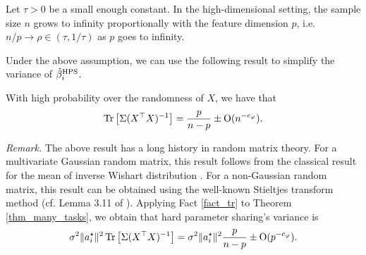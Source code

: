 \begin{assumption}\label{assume_rm}
	Let $\tau > 0$ be a small enough constant.
	In the high-dimensional setting,
  the sample size $n$ grows to infinity proportionally with the feature dimension $p$, i.e. $n / p \rightarrow \rho \in (\tau, 1/\tau)$ as $p$ goes to infinity.
\end{assumption}
Under the above assumption, we can use the following result to simplify the variance of $\hat{\beta}_i^{\textup{HPS}}$.

\begin{fact}\label{fact_tr}
	With high probability over the randomness of $X$, we have that
		\[ \operatorname{Tr}\left[\Sigma (X^{\top} X)^{-1}\right] = \frac{p}{n - p} \pm \operatorname{O}(n^{-c_{\varphi}}). \]
\end{fact}
\noindent\textit{Remark.} The above result has a long history in random matrix theory.
For a multivariate Gaussian random matrix, this result follows from the classical result for the mean of inverse Wishart distribution \cite{anderson1958introduction}.
For a non-Gaussian random matrix, this result can be obtained using the well-known Stieltjes transform method (cf. Lemma 3.11 of \cite{bai2009spectral}).
Applying Fact \ref{fact_tr} to Theorem \ref{thm_many_tasks}, we obtain that hard parameter sharing's variance is
		\[ \sigma^2 \|a^{\star}_i\|^2 \operatorname{Tr}\left[\Sigma (X^{\top} X)^{-1}\right] = \sigma^2 \|a^{\star}_i\|^2 \frac{p}{n- p} \pm \operatorname{O}(p^{- {c_{\varphi}} }). \]


